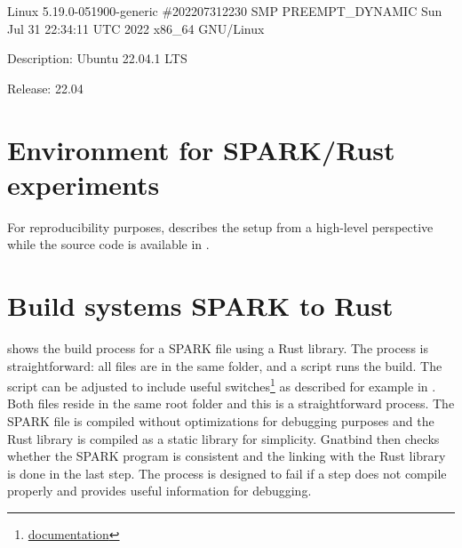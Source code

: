 \documentclass[nomenclature, english, bibtex]{kththesis}
\begin{document}
Linux 5.19.0-051900-generic \#202207312230 SMP PREEMPT\_DYNAMIC Sun Jul 31 22:34:11 UTC 2022 x86\_64 GNU/Linux

Description: Ubuntu 22.04.1 LTS

Release:	22.04

\section[Environment for \& SPARK/Rust experiments]{Environment for SPARK/Rust experiments}

For reproducibility purposes,   describes the setup from a high-level perspective while the source code is available in .


\section{Build systems SPARK to Rust}

 shows the build process for a SPARK file using a Rust library. The process is straightforward: all files are in the same folder, and a script runs the build. The script can be adjusted to include useful switches\footnote{\href{https://docs.adacore.com/gnat_ugn-docs/html/gnat_ugn/gnat_ugn/building_executable_programs_with_gnat.html}{documentation}} as described for example in . 
Both files reside in the same root folder and this is a straightforward process. 
The SPARK file is compiled without optimizations for debugging purposes and the Rust library is compiled as a static library for simplicity. 
Gnatbind then checks whether the SPARK program is consistent and the linking with the Rust library is done in the last step.
The process is designed to fail if a step does not compile properly and provides useful information for debugging.
\end{document}
